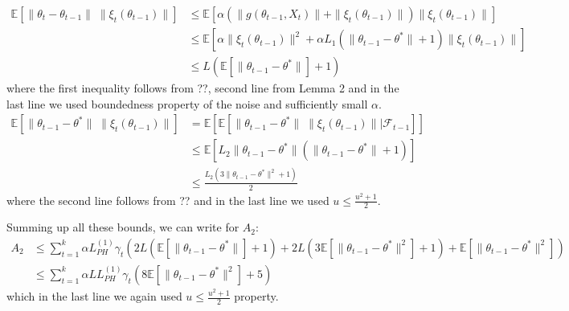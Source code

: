 \documentclass[a4paper]{article}
\newcommand{\norm}[1]{\|#1 \|}
\newcommand{\Exs}{\mathbb{E}}
\newcommand{\thetastar}{\theta^*}
\newcommand{\constLPH}[1]{L_{PH}^{(#1)}}
\newcommand{\stepsize}{\alpha}
\begin{document}
	\begin{align*}
		\Exs\left[\norm{\theta_{t} - \theta_{t - 1}} \; \norm{\xi_{t}\left(\theta_{t - 1}\right)}\right] & \leq \Exs\left[\stepsize \left(\norm{g\left(\theta_{t - 1}, X_{t}\right)} + \norm{\xi_{t}\left(\theta_{t - 1}\right)}\right)\norm{\xi_{t}\left(\theta_{t - 1}\right)}\right]\\
		& \leq \Exs\left[\stepsize\norm{\xi_{t}\left(\theta_{t - 1}\right)}^{2} + \stepsize L_{1}\left(\norm{\theta_{t - 1} - \thetastar} + 1\right)\norm{\xi_{t}\left(\theta_{t - 1}\right)}\right]\\
		& \leq L\left(\Exs\left[\norm{\theta_{t - 1} - \thetastar}\right] + 1\right)
	\end{align*}
	where the first inequality follows from ??, second line from Lemma 2 and in the last line we used boundedness property of the noise and sufficiently small $\stepsize$.
	\begin{align*}
		\Exs\left[\norm{\theta_{t - 1} - \thetastar} \; \norm{\xi_{t}\left(\theta_{t - 1}\right)}\right] &= \Exs\left[\Exs\left[\norm{\theta_{t - 1} - \thetastar} \; \norm{\xi_{t}\left(\theta_{t - 1}\right)} | \mathcal{F}_{t - 1}\right]\right]\\
		& \leq \Exs\left[L_{2}\norm{\theta_{t - 1} - \thetastar}\left(\norm{\theta_{t -1} - \thetastar} + 1\right)\right]\\
		& \leq \frac{L_{2}\left(3\norm{\theta_{t - 1} - \thetastar}^{2} + 1\right)}{2}
	\end{align*}
	where the second line follows from ?? and in the last line we used $u \leq \frac{u^{2} + 1}{2}$.
		
	Summing up all these bounds, we can write for $A_{2}$:
	\begin{align*}
		A_{2} & \leq \sum_{t = 1}^{k}\stepsize \constLPH{1}\gamma_{t}\left(2L\left(\Exs\left[\norm{\theta_{t - 1} - \thetastar}\right] + 1\right) + 2L\left(3\Exs\left[\norm{\theta_{t - 1} - \thetastar}^{2}\right] + 1\right) + \Exs\left[\norm{\theta_{t - 1} - \thetastar}^{2}\right]\right)\\
		& \leq \sum_{t = 1}^{k}\stepsize L \constLPH{1}\gamma_{t}\left(8\Exs\left[\norm{\theta_{t - 1} - \thetastar}^{2}\right] + 5\right)
	\end{align*}
	which in the last line we again used $u \leq \frac{u^{2} + 1}{2}$ property.	
	
\end{document}
